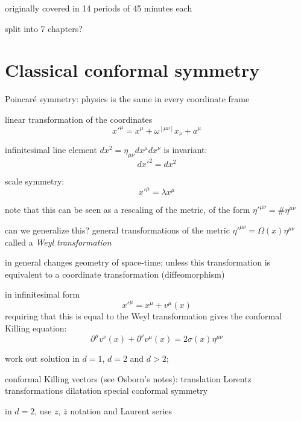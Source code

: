 \documentclass[a4paper,12pt]{article}
\numberwithin{equation}{section}
\begin{document}
originally covered in 14 periods of 45 minutes each

split into 7 chapters?


\section{Classical conformal symmetry}


Poincar\'e symmetry: physics is the same in every coordinate frame

linear transformation of the coordinates
\begin{equation}
	x'^\mu = x^\mu + \omega^{[\mu\nu]} x_\nu + a^\mu
\end{equation}


infinitesimal line element $dx^2 = \eta_{\mu\nu} dx^\mu dx^\nu$ is invariant:
\begin{equation}
	dx'^2 = dx^2
\end{equation}


scale symmetry:
\begin{equation}
	x'^\mu = \lambda x^\mu
\end{equation}

note that this can be seen as a rescaling of the metric, of the form
$\eta'^{\mu\nu} = \# \eta^{\mu\nu}$


can we generalize this? general transformations of the metric $\eta'^{\mu\nu} = \Omega(x) \eta^{\mu\nu}$
called a \emph{Weyl transformation}

in general changes geometry of space-time; unless this transformation is equivalent to a coordinate transformation (diffeomorphism)

in infinitesimal form
\begin{equation}
	x'^\mu = x^\mu + v^\mu(x)
\end{equation}
requiring that this is equal to the Weyl transformation gives the conformal Killing equation:
\begin{equation}
	\partial^\mu v^\nu(x) + \partial^\nu v^\mu(x)
	= 2 \sigma(x) \eta^{\mu\nu}
\end{equation}

work out solution in $d = 1$, $d = 2$ and $d > 2$;


conformal Killing vectors (see Osborn's notes):
translation
Lorentz transformations
dilatation
special conformal symmetry



in $d = 2$, use $z$, $\bar{z}$ notation and Laurent series
\end{document}
